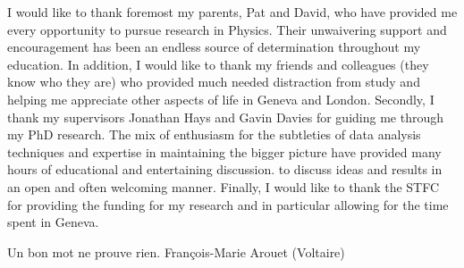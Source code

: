 \begin{acknowledgements}
  I would like to thank foremost my parents, Pat and David, who have provided me every opportunity to 
pursue research in Physics. Their unwaivering support and encouragement has been
an endless source of determination throughout my education. In addition, I would like to thank my friends and colleagues (they know who they are) who provided much needed distraction from study and helping me appreciate other aspects of life in Geneva and London.  
  Secondly, I thank my supervisors Jonathan Hays and Gavin Davies for guiding me through my PhD research.
The mix of enthusiasm for the subtleties of data analysis techniques and expertise in maintaining the 
bigger picture have provided many hours of educational and entertaining discussion.
to discuss ideas and results in an open and often welcoming manner.  
  Finally, I would like to thank the STFC for providing the funding for my research and 
 in particular allowing for the time spent in Geneva.

\end{acknowledgements}



\tableofcontents

\listoffigures
\listoftables
\frontquote%
  {Un bon mot ne prouve rien.}%
  {Fran\c{c}ois-Marie Arouet (Voltaire)}
